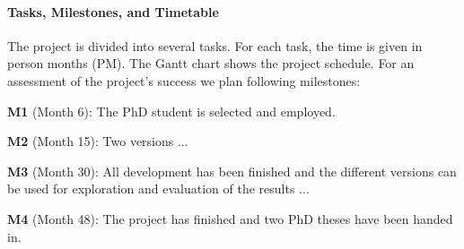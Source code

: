 \documentclass[fleqn,12pt]{article}
\begin{document}
\paragraph*{Tasks, Milestones, and Timetable}

The project is divided into several tasks.
For each task, the time is given in person months (PM). The Gantt chart shows
the project schedule.
For an assessment of the project's success we plan following milestones:

\textbf{M1} (Month 6): The PhD student is selected and employed.

\textbf{M2} (Month 15): Two versions ...

\textbf{M3} (Month 30): All development has been finished and the different versions
can be used for exploration and evaluation of the results ...

\textbf{M4} (Month 48): The project has finished and two PhD theses have been handed in.
\end{document}
